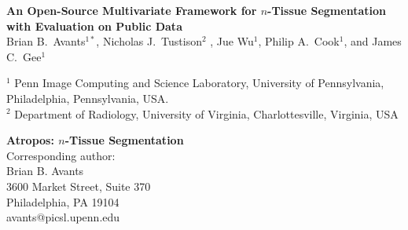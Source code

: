\documentclass[11pt,english]{article}
\begin{document}
\normalem

\vspace*{5cm}

\begin{center}
{\Large \bf An Open-Source Multivariate Framework for $n$-Tissue
  Segmentation with Evaluation on Public Data} \\
\vspace*{0.5cm}
{\normalsize Brian B.~Avants$^{1*}$,  Nicholas J.~Tustison$^2$%
, 
Jue Wu$^1$, Philip A.~Cook$^1$, and James C.~Gee$^1$} \\
\begin{singlespace} 
{\scriptsize  $^1$ Penn Image Computing and Science Laboratory, University of Pennsylvania, Philadelphia, Pennsylvania,  USA.\\
  $^2$ Department of Radiology, University of Virginia, Charlottesville, Virginia, USA}
\end{singlespace}
\end{center}

\vfill

\begin{singlespace} 
\scriptsize
\flushleft
{\bf Atropos:  $n$-Tissue Segmentation}\\
Corresponding author: \\
Brian B. Avants\\
3600 Market Street, Suite 370\\
Philadelphia, PA  19104\\
avants@picsl.upenn.edu\\
\end{singlespace} 

%
%

\clearpage
\end{document}
